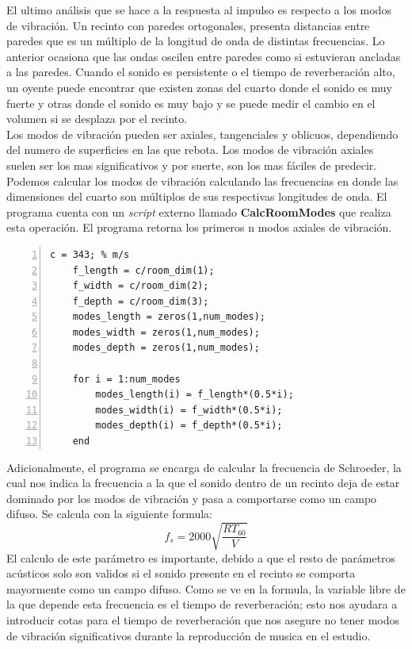 El ultimo análisis que se hace a la respuesta al impulso es respecto a los modos de vibración. Un recinto con paredes ortogonales, presenta distancias entre paredes que es un múltiplo de la longitud de onda de distintas frecuencias. Lo anterior ocasiona que las ondas oscilen entre paredes como si estuvieran ancladas a las paredes. Cuando el sonido es persistente o el tiempo de reverberación alto, un oyente puede encontrar que existen zonas del cuarto donde el sonido es muy fuerte y otras donde el sonido es muy bajo y se puede medir el cambio en el volumen si se desplaza por el recinto. \\
Los modos de vibración pueden ser axiales, tangenciales y oblicuos, dependiendo del numero de superficies en las que rebota. Los modos de vibración axiales suelen ser los mas significativos y por suerte, son los mas fáciles de predecir. \\
Podemos calcular los modos de vibración calculando las frecuencias en donde las dimensiones del cuarto son múltiplos de sus respectivas longitudes de onda. El programa cuenta con un \textit{script} externo llamado \textbf{CalcRoomModes} que realiza esta operación. El programa retorna los primeros n modos axiales de vibración.
\begin{lstlisting}[frame=single,numbers=left, style=Matlab-editor, basicstyle=\tiny]
    c = 343; % m/s
    f_length = c/room_dim(1);
    f_width = c/room_dim(2);
    f_depth = c/room_dim(3);
    modes_length = zeros(1,num_modes);
    modes_width = zeros(1,num_modes);
    modes_depth = zeros(1,num_modes);

    for i = 1:num_modes
        modes_length(i) = f_length*(0.5*i); 
        modes_width(i) = f_width*(0.5*i);
        modes_depth(i) = f_depth*(0.5*i);
    end
\end{lstlisting}
Adicionalmente, el programa se encarga de calcular la frecuencia de Schroeder, la cual nos indica la frecuencia a la que el sonido dentro de un recinto deja de estar dominado por los modos de vibración y pasa a comportarse como un campo difuso. Se calcula con la siguiente formula:
$$f_s = 2000\sqrt{\frac{RT_{60}}{V}}$$
El calculo de este parámetro es importante, debido a que el resto de parámetros acústicos solo son validos si el sonido presente en el recinto se comporta mayormente como un campo difuso. Como se ve en la formula, la variable libre de la que depende esta frecuencia es el tiempo de reverberación; esto nos ayudara a introducir cotas para el tiempo de reverberación que nos asegure no tener modos de vibración significativos durante la reproducción de musica en el estudio.
